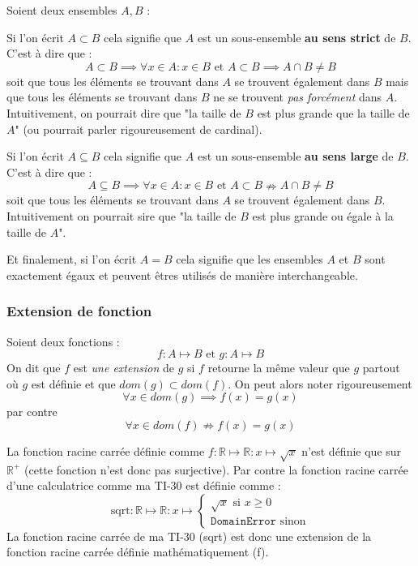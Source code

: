 \begin{myexem}
\noindent Soient deux ensembles $A, B$ :

\vspace{0.3cm}

\noindent Si l'on écrit $ A \subset B $ cela signifie que $A$ est un sous-ensemble \textbf{au sens strict} de $B$. C'est à dire que : $$ A \subset B \implies \forall x \in A : x \in B \text{ et } A \subset B \implies A \cap B \ne B$$ soit que tous les éléments se trouvant dans $A$ se trouvent également dans $B$ mais que tous les éléments se trouvant dans $B$ ne se trouvent \emph{pas forcément} dans $A$. Intuitivement, on pourrait dire que "la taille de $B$ est plus grande que la taille de $A$" (ou pourrait parler rigoureusement de cardinal).

\vspace{0.3cm}

\noindent Si l'on écrit $ A \subseteq B $ cela signifie que $A$ est un sous-ensemble \textbf{au sens large} de $B$. C'est à dire que : $$ A \subseteq B \implies \forall x \in A : x \in B \text{ et } A \subset B \nRightarrow  A \cap B \ne B$$ soit que tous les éléments se trouvant dans $A$ se trouvent également dans $B$. Intuitivement on pourrait sire que "la taille de $B$ est plus grande ou égale à la taille de $A$".

\vspace{0.3cm}

\noindent Et finalement, si l'on écrit  $ A = B $ cela signifie que les ensembles $A$ et $B$ sont exactement égaux et peuvent êtres utilisés de manière interchangeable.
\newpage
\subsubsection{Extension de fonction}
\begin{mydef}
    Soient deux fonctions : $$ f : A \mapsto B \text{ et } g : A \mapsto B$$ On dit que $f$ est \emph{une extension} de $g$ si $f$ retourne la même valeur que $g$ partout où $g$ est définie et que $dom(g) \subset dom(f)$. On peut alors noter rigoureusement $$ \forall x \in dom(g) \implies f(x) = g(x)$$ par contre 
    $$ \forall x \in dom(f) \nRightarrow f(x) = g(x) $$
\end{mydef}
\vspace{0.3cm}
\begin{myexem}
    La fonction racine carrée définie comme $f : \mathbb{R} \mapsto \mathbb{R} : x \mapsto \sqrt{x}$ n'est définie que sur $\mathbb{R}^+$ (cette fonction n'est donc pas surjective). Par contre la fonction racine carrée d'une calculatrice comme ma TI-30 est définie comme :
    $$ \text{sqrt} : \mathbb{R} \mapsto \mathbb{R} : x \mapsto \begin{cases}
    \sqrt{x} \text{ si } x \geq 0 \\
    \texttt{DomainError } \text{sinon}
    \end{cases}
    $$
    La fonction racine carrée de ma TI-30 (sqrt) est donc une extension de la fonction racine carrée définie mathématiquement (f).
\end{myexem}

\end{myexem}

